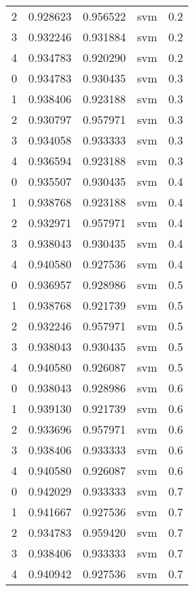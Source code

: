 \begin{tabular}{rrrlr}
     2 & 0.928623 & 0.956522 &      svm &        0.2 \\
     3 & 0.932246 & 0.931884 &      svm &        0.2 \\
     4 & 0.934783 & 0.920290 &      svm &        0.2 \\
     0 & 0.934783 & 0.930435 &      svm &        0.3 \\
     1 & 0.938406 & 0.923188 &      svm &        0.3 \\
     2 & 0.930797 & 0.957971 &      svm &        0.3 \\
     3 & 0.934058 & 0.933333 &      svm &        0.3 \\
     4 & 0.936594 & 0.923188 &      svm &        0.3 \\
     0 & 0.935507 & 0.930435 &      svm &        0.4 \\
     1 & 0.938768 & 0.923188 &      svm &        0.4 \\
     2 & 0.932971 & 0.957971 &      svm &        0.4 \\
     3 & 0.938043 & 0.930435 &      svm &        0.4 \\
     4 & 0.940580 & 0.927536 &      svm &        0.4 \\
     0 & 0.936957 & 0.928986 &      svm &        0.5 \\
     1 & 0.938768 & 0.921739 &      svm &        0.5 \\
     2 & 0.932246 & 0.957971 &      svm &        0.5 \\
     3 & 0.938043 & 0.930435 &      svm &        0.5 \\
     4 & 0.940580 & 0.926087 &      svm &        0.5 \\
     0 & 0.938043 & 0.928986 &      svm &        0.6 \\
     1 & 0.939130 & 0.921739 &      svm &        0.6 \\
     2 & 0.933696 & 0.957971 &      svm &        0.6 \\
     3 & 0.938406 & 0.933333 &      svm &        0.6 \\
     4 & 0.940580 & 0.926087 &      svm &        0.6 \\
     0 & 0.942029 & 0.933333 &      svm &        0.7 \\
     1 & 0.941667 & 0.927536 &      svm &        0.7 \\
     2 & 0.934783 & 0.959420 &      svm &        0.7 \\
     3 & 0.938406 & 0.933333 &      svm &        0.7 \\
     4 & 0.940942 & 0.927536 &      svm &        0.7 \\

\end{tabular}
